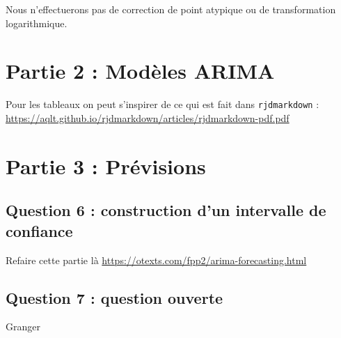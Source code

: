 \documentclass[]{article}
\begin{document}
Nous n'effectuerons pas de correction de point atypique ou de transformation logarithmique.

\hypertarget{partie-2-moduxe8les-arima}{%
\section{Partie 2 : Modèles ARIMA}\label{partie-2-moduxe8les-arima}}

Pour les tableaux on peut s'inspirer de ce qui est fait dans \texttt{rjdmarkdown} : \url{https://aqlt.github.io/rjdmarkdown/articles/rjdmarkdown-pdf.pdf}

\hypertarget{partie-3-pruxe9visions}{%
\section{Partie 3 : Prévisions}\label{partie-3-pruxe9visions}}

\hypertarget{question-6-construction-dun-intervalle-de-confiance}{%
\subsection{Question 6 : construction d'un intervalle de confiance}\label{question-6-construction-dun-intervalle-de-confiance}}

Refaire cette partie là
\url{https://otexts.com/fpp2/arima-forecasting.html}

\hypertarget{question-7-question-ouverte}{%
\subsection{Question 7 : question ouverte}\label{question-7-question-ouverte}}

Granger
\end{document}
